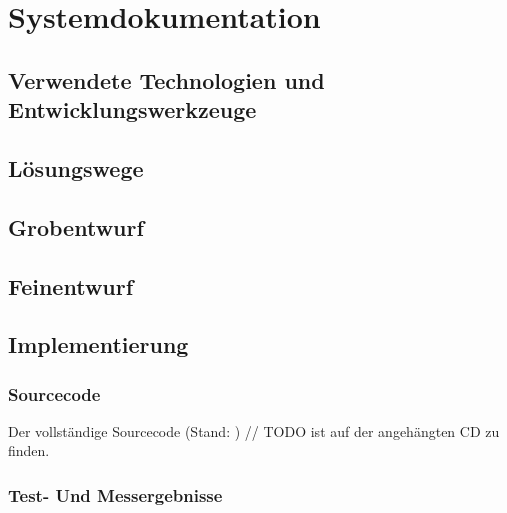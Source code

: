 \chapter{Systemdokumentation}

\section[Technologien]{Verwendete Technologien und Entwicklungswerkzeuge}





\section{Lösungswege}








\section{Grobentwurf}



\section{Feinentwurf}

\section{Implementierung}

\subsection{Sourcecode}

Der vollständige Sourcecode (Stand: ) // TODO
ist auf der angehängten CD zu finden.

\subsection{Test- Und Messergebnisse}
